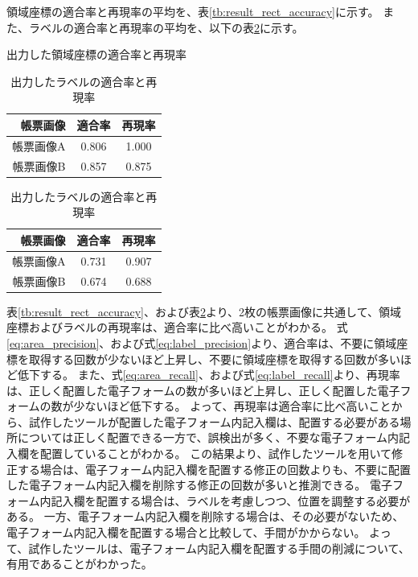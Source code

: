 領域座標の適合率と再現率の平均を、表\ref{tb:result_rect_accuracy}に示す。
また、ラベルの適合率と再現率の平均を、以下の表\ref{tb:result_label_accuracy}に示す。
\begin{table}[tp]
    \centering
    \begin{minipage}[h]{0.47\linewidth}
        \caption{出力した領域座標の適合率と再現率}
        \label{tb:result_rect_accuracy}
        \centering
        \begin{tabular}{r|c|c}
            帳票画像 & 適合率 & 再現率 \\
            \hline \hline
            帳票画像A & 0.806 & 1.000 \\
            帳票画像B & 0.857 & 0.875 \\
        \end{tabular}
    \end{minipage}
    \begin{minipage}[h]{0.47\linewidth}
        \caption{出力したラベルの適合率と再現率}
        \label{tb:result_label_accuracy}
        \centering
        \begin{tabular}{r|c|c}
            帳票画像 & 適合率 & 再現率 \\
            \hline \hline
            帳票画像A & 0.731 & 0.907 \\
            帳票画像B & 0.674 & 0.688 \\
        \end{tabular}
    \end{minipage}
\end{table}
表\ref{tb:result_rect_accuracy}、および表\ref{tb:result_label_accuracy}より、2枚の帳票画像に共通して、領域座標およびラベルの再現率は、適合率に比べ高いことがわかる。
式\ref{eq:area_precision}、および式\ref{eq:label_precision}より、適合率は、不要に領域座標を取得する回数が少ないほど上昇し、不要に領域座標を取得する回数が多いほど低下する。
また、式\ref{eq:area_recall}、および式\ref{eq:label_recall}より、再現率は、正しく配置した電子フォームの数が多いほど上昇し、正しく配置した電子フォームの数が少ないほど低下する。
よって、再現率は適合率に比べ高いことから、試作したツールが配置した電子フォーム内記入欄は、配置する必要がある場所については正しく配置できる一方で、誤検出が多く、不要な電子フォーム内記入欄を配置していることがわかる。
この結果より、試作したツールを用いて修正する場合は、電子フォーム内記入欄を配置する修正の回数よりも、不要に配置した電子フォーム内記入欄を削除する修正の回数が多いと推測できる。
電子フォーム内記入欄を配置する場合は、ラベルを考慮しつつ、位置を調整する必要がある。
一方、電子フォーム内記入欄を削除する場合は、その必要がないため、電子フォーム内記入欄を配置する場合と比較して、手間がかからない。
よって、試作したツールは、電子フォーム内記入欄を配置する手間の削減について、有用であることがわかった。

